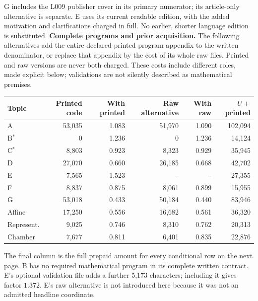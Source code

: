 \documentclass[11pt,a4paper]{article}
\newcommand{\smalltable}{\small\setlength{\tabcolsep}{5pt}\renewcommand{\arraystretch}{1.13}}
\begin{document}
G includes the L009 publisher cover in its primary numerator; its article-only alternative is separate. E uses its current readable edition, with the added motivation and clarifications charged in full. No earlier, shorter language edition is substituted.
\newpage
\textbf{Complete programs and prior acquisition.} The following alternatives add the entire declared printed program appendix to the written denominator, or replace that appendix by the cost of its whole raw files. Printed and raw versions are never both charged. These costs include different roles, made explicit below; validations are not silently described as mathematical premises.
\begin{center}\smalltable
\begin{tabular}{lrrrrr}\toprule
Topic & Printed code & With printed & Raw alternative & With raw & $U+$printed\\\midrule
A & 53,035 & 1.083 & 51,970 & 1.090 & 102,094 \\
B$^*$ & 0 & 1.236 & 0 & 1.236 & 14,124 \\
C$^*$ & 8,803 & 0.923 & 8,323 & 0.929 & 35,945 \\
D & 27,070 & 0.660 & 26,185 & 0.668 & 42,702 \\
E & 7,565 & 1.523 & -- & -- & 27,355 \\
F & 8,837 & 0.875 & 8,061 & 0.899 & 15,955 \\
G & 53,018 & 0.433 & 50,184 & 0.440 & 83,946 \\
Affine & 17,250 & 0.556 & 16,682 & 0.561 & 36,320 \\
Represent. & 9,025 & 0.746 & 8,310 & 0.762 & 20,313 \\
Chamber & 7,677 & 0.811 & 6,401 & 0.835 & 22,876 \\
\bottomrule\end{tabular}\end{center}
The final column is the full prepaid amount for every conditional row on the next page. B has no required mathematical program in its complete written contract. E's optional validation file adds a further 5,173 characters; including it gives factor $1.372$. E's raw alternative is not introduced here because it was not an admitted headline coordinate.
\end{document}
